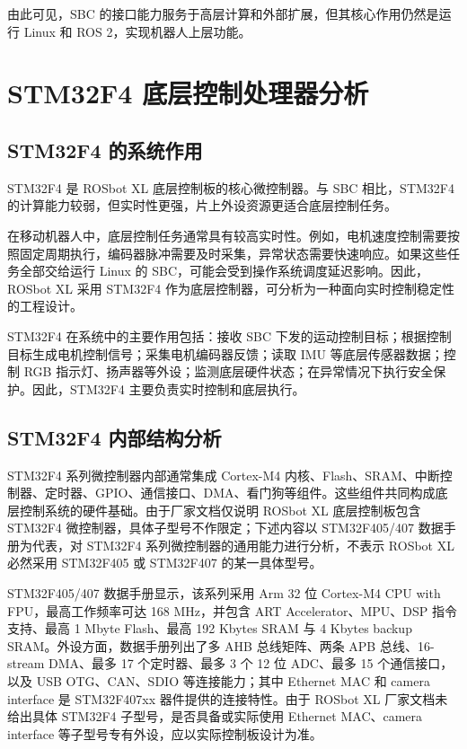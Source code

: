 \documentclass[UTF8,a4paper,12pt]{ctexrep}
\begin{document}
由此可见，SBC 的接口能力服务于高层计算和外部扩展，但其核心作用仍然是运行 Linux 和 ROS 2，实现机器人上层功能。

\section{STM32F4 底层控制处理器分析}

\subsection{STM32F4 的系统作用}

STM32F4 是 ROSbot XL 底层控制板的核心微控制器。与 SBC 相比，STM32F4 的计算能力较弱，但实时性更强，片上外设资源更适合底层控制任务。

在移动机器人中，底层控制任务通常具有较高实时性。例如，电机速度控制需要按照固定周期执行，编码器脉冲需要及时采集，异常状态需要快速响应。如果这些任务全部交给运行 Linux 的 SBC，可能会受到操作系统调度延迟影响。因此，ROSbot XL 采用 STM32F4 作为底层控制器，可分析为一种面向实时控制稳定性的工程设计。

STM32F4 在系统中的主要作用包括：接收 SBC 下发的运动控制目标；根据控制目标生成电机控制信号；采集电机编码器反馈；读取 IMU 等底层传感器数据；控制 RGB 指示灯、扬声器等外设；监测底层硬件状态；在异常情况下执行安全保护。因此，STM32F4 主要负责实时控制和底层执行。

\subsection{STM32F4 内部结构分析}

STM32F4 系列微控制器内部通常集成 Cortex-M4 内核、Flash、SRAM、中断控制器、定时器、GPIO、通信接口、DMA、看门狗等组件。这些组件共同构成底层控制系统的硬件基础。由于厂家文档仅说明 ROSbot XL 底层控制板包含 STM32F4 微控制器，具体子型号不作限定；下述内容以 STM32F405/407 数据手册为代表，对 STM32F4 系列微控制器的通用能力进行分析，不表示 ROSbot XL 必然采用 STM32F405 或 STM32F407 的某一具体型号。

STM32F405/407 数据手册显示，该系列采用 Arm 32 位 Cortex-M4 CPU with FPU，最高工作频率可达 168 MHz，并包含 ART Accelerator、MPU、DSP 指令支持、最高 1 Mbyte Flash、最高 192 Kbytes SRAM 与 4 Kbytes backup SRAM。外设方面，数据手册列出了多 AHB 总线矩阵、两条 APB 总线、16-stream DMA、最多 17 个定时器、最多 3 个 12 位 ADC、最多 15 个通信接口，以及 USB OTG、CAN、SDIO 等连接能力；其中 Ethernet MAC 和 camera interface 是 STM32F407xx 器件提供的连接特性。由于 ROSbot XL 厂家文档未给出具体 STM32F4 子型号，是否具备或实际使用 Ethernet MAC、camera interface 等子型号专有外设，应以实际控制板设计为准。
\end{document}
